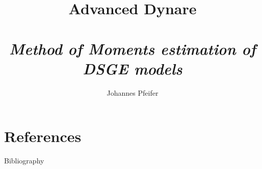\documentclass[handout,usepdftitle=false,xcolor=dvipsnames,aspectratio=169]{beamer}
\title[]{\textbf{Advanced Dynare\\}
\medskip{Chapter IX}\\
\emph{Method of Moments estimation of DSGE models}
}
\author{Johannes Pfeifer}
\begin{document}
\maketitle



\part{References}
\begin{frame}[allowframebreaks]{Bibliography}
\printbibliography
\end{frame}
\end{document}
